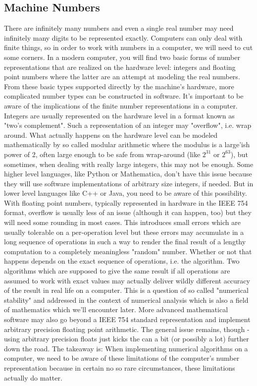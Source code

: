 \subsection{Machine Numbers}
There are infinitely many numbers and even a single real number may need infinitely many digits to be represented exactly. Computers can only deal with finite things, so in order to work with numbers in a computer, we will need to cut some corners. In a modern computer, you will find two basic forms of number representations that are realized on the hardware level: integers and floating point numbers where the latter are an attempt at modeling the real numbers. From these basic types supported directly by the machine's hardware, more complicated number types can be constructed in software. It's important to be aware of the implications of the finite number representations in a computer. Integers are usually represented on the hardware level in a format known as "two's complement". Such a representation of an integer may "overflow", i.e. wrap around. What actually happens on the hardware level can be modeled mathematically by so called modular arithmetic where the modulus is a large'ish power of 2, often large enough to be safe from wrap-around (like $2^{31}$ or $2^{63}$), but sometimes, when dealing with really large integers, this may not be enough. Some higher level languages, like Python or Mathematica, don't have this issue because they will use software implementations of arbitrary size integers, if needed. But in lower level languages like C++ or Java, you need to be aware of this possibility. With floating point numbers, typically represented in hardware in the IEEE 754 format, overflow is usually less of an issue (although it can happen, too) but they will need some rounding in most cases. This introduces small errors which are usually tolerable on a per-operation level but these errors may accumulate in a long sequence of operations in such a way to render the final result of a lengthy computation to a completely meaningless "random" number. Whether or not that happens depends on the exact sequence of operations, i.e. the algorithm. Two algorithms which are supposed to give the same result if all operations are assumed to work with exact values may actually deliver wildly different accuracy of the result in real life on a computer. This is a question of so called "numerical stability" and addressed in the context of numerical analysis which is also a field of mathematics which we'll encounter later. More advanced mathematical software may also go beyond a IEEE 754 standard representation and implement arbitrary precision floating point arithmetic. The general issue remains, though - using arbitrary precision floats just kicks the can a bit (or possibly a lot) further down the road. The takeaway is: When implementing numerical algorithms on a computer, we need to be aware of these limitations of the computer's number representation because in certain no so rare circumstances, these limitations actually do matter.


